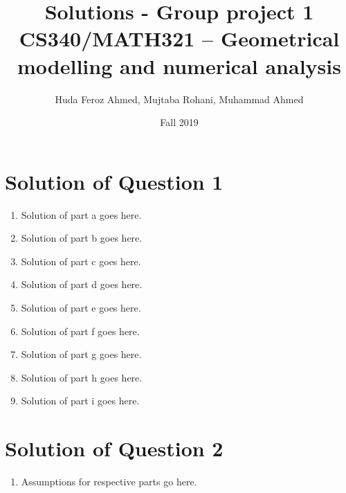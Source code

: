 \documentclass[a4paper, 11pt]{article}
\title{Solutions - Group project 1\\CS340/MATH321 -- Geometrical modelling and numerical analysis}
\date{Fall 2019}
\author{Huda Feroz Ahmed, Mujtaba Rohani, Muhammad Ahmed}
\begin{document}
\maketitle  
\setlength{\parskip}{10pt}
\setlength{\parindent}{0pt}

\section*{Solution of Question 1}
    
\begin{enumerate}
    \item
    Solution of part a goes here.
    
    \item
    Solution of part b goes here.
    
    \item
    Solution of part c goes here.
    
    \item
    Solution of part d goes here.
    
    \item
    Solution of part e goes here.
    
    \item
    Solution of part f goes here.
    
    \item
    Solution of part g goes here.
    
    \item
    Solution of part h goes here.
    
    \item
    Solution of part i goes here.
    
\end{enumerate}

\section*{Solution of Question 2}
    
\begin{enumerate}
    \item
    Assumptions for respective parts go here.
    
\end{enumerate}
\end{document}
